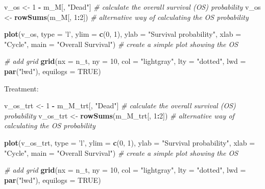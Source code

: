 \documentclass[
]{article}
\newenvironment{Shaded}{\begin{snugshade}}{\end{snugshade}}
\newcommand{\CommentTok}[1]{\textcolor[rgb]{0.56,0.35,0.01}{\textit{#1}}}
\newcommand{\DataTypeTok}[1]{\textcolor[rgb]{0.13,0.29,0.53}{#1}}
\newcommand{\DecValTok}[1]{\textcolor[rgb]{0.00,0.00,0.81}{#1}}
\newcommand{\KeywordTok}[1]{\textcolor[rgb]{0.13,0.29,0.53}{\textbf{#1}}}
\newcommand{\NormalTok}[1]{#1}
\newcommand{\OperatorTok}[1]{\textcolor[rgb]{0.81,0.36,0.00}{\textbf{#1}}}
\newcommand{\OtherTok}[1]{\textcolor[rgb]{0.56,0.35,0.01}{#1}}
\newcommand{\StringTok}[1]{\textcolor[rgb]{0.31,0.60,0.02}{#1}}
\begin{document}
\begin{Shaded}
\begin{Highlighting}[]
\NormalTok{v_os <-}\StringTok{ }\DecValTok{1} \OperatorTok{-}\StringTok{ }\NormalTok{m_M[, }\StringTok{"Dead"}\NormalTok{]             }\CommentTok{# calculate the overall survival (OS) probability}
\NormalTok{v_os <-}\StringTok{ }\KeywordTok{rowSums}\NormalTok{(m_M[, }\DecValTok{1}\OperatorTok{:}\DecValTok{2}\NormalTok{])           }\CommentTok{# alternative way of calculating the OS probability   }

\KeywordTok{plot}\NormalTok{(v_os, }\DataTypeTok{type =} \StringTok{'l'}\NormalTok{, }
     \DataTypeTok{ylim =} \KeywordTok{c}\NormalTok{(}\DecValTok{0}\NormalTok{, }\DecValTok{1}\NormalTok{),}
     \DataTypeTok{ylab =} \StringTok{"Survival probability"}\NormalTok{,}
     \DataTypeTok{xlab =} \StringTok{"Cycle"}\NormalTok{,}
     \DataTypeTok{main =} \StringTok{"Overall Survival"}\NormalTok{)       }\CommentTok{# create a simple plot showing the OS}

\CommentTok{# add grid }
\KeywordTok{grid}\NormalTok{(}\DataTypeTok{nx =}\NormalTok{ n_t, }\DataTypeTok{ny =} \DecValTok{10}\NormalTok{, }\DataTypeTok{col =} \StringTok{"lightgray"}\NormalTok{, }\DataTypeTok{lty =} \StringTok{"dotted"}\NormalTok{, }\DataTypeTok{lwd =} \KeywordTok{par}\NormalTok{(}\StringTok{"lwd"}\NormalTok{), }
     \DataTypeTok{equilogs =} \OtherTok{TRUE}\NormalTok{) }
\end{Highlighting}
\end{Shaded}

Treatment:

\begin{Shaded}
\begin{Highlighting}[]
\NormalTok{v_os_trt <-}\StringTok{ }\DecValTok{1} \OperatorTok{-}\StringTok{ }\NormalTok{m_M_trt[, }\StringTok{"Dead"}\NormalTok{]     }\CommentTok{# calculate the overall survival (OS) probability}
\NormalTok{v_os_trt <-}\StringTok{ }\KeywordTok{rowSums}\NormalTok{(m_M_trt[, }\DecValTok{1}\OperatorTok{:}\DecValTok{2}\NormalTok{])   }\CommentTok{# alternative way of calculating the OS probability}

\KeywordTok{plot}\NormalTok{(v_os_trt, }\DataTypeTok{type =} \StringTok{'l'}\NormalTok{, }
     \DataTypeTok{ylim =} \KeywordTok{c}\NormalTok{(}\DecValTok{0}\NormalTok{, }\DecValTok{1}\NormalTok{),}
     \DataTypeTok{ylab =} \StringTok{"Survival probability"}\NormalTok{,}
     \DataTypeTok{xlab =} \StringTok{"Cycle"}\NormalTok{,}
     \DataTypeTok{main =} \StringTok{"Overall Survival"}\NormalTok{)       }\CommentTok{# create a simple plot showing the OS}

\CommentTok{# add grid }
\KeywordTok{grid}\NormalTok{(}\DataTypeTok{nx =}\NormalTok{ n_t, }\DataTypeTok{ny =} \DecValTok{10}\NormalTok{, }\DataTypeTok{col =} \StringTok{"lightgray"}\NormalTok{, }\DataTypeTok{lty =} \StringTok{"dotted"}\NormalTok{, }\DataTypeTok{lwd =} \KeywordTok{par}\NormalTok{(}\StringTok{"lwd"}\NormalTok{), }
     \DataTypeTok{equilogs =} \OtherTok{TRUE}\NormalTok{) }
\end{Highlighting}
\end{Shaded}
\end{document}
